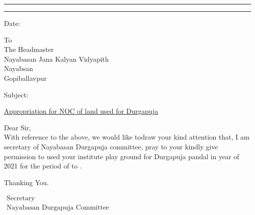 

\begin{center}
\myheader
\end{center}
\hrule \vspace*{2pt} \hrule  \vspace*{20pt}
\begin{adjustwidth}{15mm}{15mm}\large 
	\begin{flushright} 
		Date: \underline{\datecontainer}
	\end{flushright}\large\vspace{1cm}
	
	\noindent To\\
	  The Headmaster\\
	 Nayabasan Jana Kalyan Vidyapith\\
  Nayabsan\\
	  Gopiballavpur 
	 \vspace{1cm}
	 
	\noindent\begin{minipage}{.1\textwidth} Subject:
		\end{minipage}\begin{minipage}{.8\textwidth} 
		\underline{Appropriation for NOC of land used for Durgapuja \thisyear }
	\end{minipage}
\vspace{1cm}

\noindent Dear Sir,\\
\hspace*{1.5cm} 
With reference to the above, we would like todraw your kind attention that, I am secretary of Nayabasan Durgapuja committee, pray to your kindly give permission to used your institute play ground for Durgapuja pandal in year of 2021 for the period of \SchoolPermissionFrom  to \SchoolPermissionTo. 

Thanking You. 
	\vspace{7ex}
	\begin{flushright}
		$\begin{array}{c}\mbox{Secretary}\\\mbox{Nayabasan Durgapuja Committee}\end{array}$
	\end{flushright}
\end{adjustwidth}

